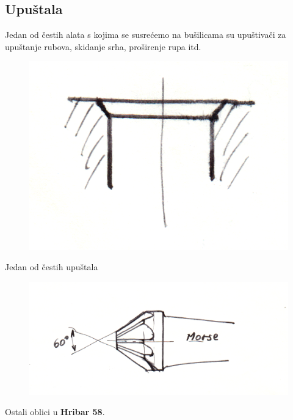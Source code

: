 \documentclass[a4paper,12pt]{article}
\numberwithin{figure}{section}
\begin{document}
\subsection{Upuštala}
Jedan od čestih alata s kojima se susrećemo na bušilicama su upuštivači za upuštanje rubova, skidanje srha, proširenje rupa itd.
\begin{figure}[!h]
\centering
\includegraphics[scale=0.13]{image_25-3.png}
\end{figure}
\FloatBarrier
Jedan od čestih upuštala
\begin{figure}[!h]
\centering
\includegraphics[scale=0.13]{image_25-4.png}
\end{figure}
\FloatBarrier
Ostali oblici u \textbf{Hribar 58}.
\end{document}

